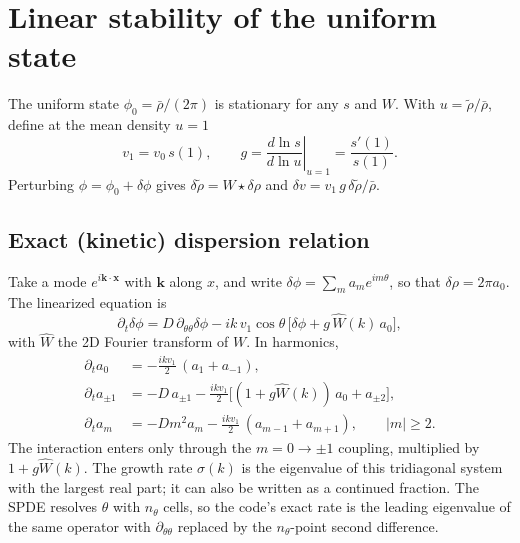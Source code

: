 \documentclass[11pt]{article}
\newcommand{\rt}{\tilde\rho}
\newcommand{\rb}{\bar\rho}
\newcommand{\Wh}{\hat W}
\begin{document}
\section{Linear stability of the uniform state}

The uniform state $\phi_0 = \rb/(2\pi)$ is stationary for any $s$ and $W$.
With $u = \rt/\rb$, define at the mean density $u=1$
\begin{equation}
  v_1 = v_0\,s(1), \qquad
  g = \left.\frac{d\ln s}{d\ln u}\right|_{u=1} = \frac{s'(1)}{s(1)} .
\end{equation}
Perturbing $\phi=\phi_0+\delta\phi$ gives $\delta\rt = W\star\delta\rho$ and
$\delta v = v_1\,g\,\delta\rt/\rb$.

\subsection{Exact (kinetic) dispersion relation}
Take a mode $e^{i\mathbf{k}\cdot\mathbf{x}}$ with $\mathbf{k}$ along $x$, and
write $\delta\phi = \sum_m a_m e^{im\theta}$, so that $\delta\rho = 2\pi a_0$.
The linearized equation is
\begin{equation}
  \partial_t\delta\phi = D\,\partial_{\theta\theta}\delta\phi
     - ik\,v_1\cos\theta\,\bigl[\delta\phi + g\,\Wh(k)\,a_0\bigr],
\end{equation}
with $\Wh$ the 2D Fourier transform of $W$. In harmonics,
\begin{align}
  \partial_t a_0 &= -\tfrac{ikv_1}{2}\,(a_1+a_{-1}),\\
  \partial_t a_{\pm1} &= -D\,a_{\pm1}
      - \tfrac{ikv_1}{2}\bigl[(1+g\Wh(k))\,a_0 + a_{\pm2}\bigr],\\
  \partial_t a_m &= -Dm^2 a_m - \tfrac{ikv_1}{2}\,(a_{m-1}+a_{m+1}),
      \qquad |m|\ge2 .
\end{align}
The interaction enters only through the $m=0\to\pm1$ coupling, multiplied by
$1+g\Wh(k)$. The growth rate $\sigma(k)$ is the eigenvalue of this
tridiagonal system with the largest real part; it can also be written as a
continued fraction. The SPDE resolves $\theta$ with $n_\theta$ cells, so the
code's exact rate is the leading eigenvalue of the same operator with
$\partial_{\theta\theta}$ replaced by the $n_\theta$-point second difference.
\end{document}

